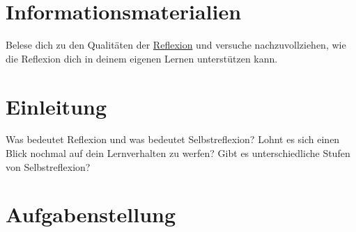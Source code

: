 \documentclass[a4paper,oneside]{scrarticle}
\begin{document}
	\pagebreak 
	
	\section*{Informationsmaterialien}
	
	Belese dich zu den Qualitäten der \href{https://doi.org/10.1007/s40692-020-00157-6}{Reflexion}\cite{sultana_e-portfolios_2020} und versuche nachzuvollziehen, wie die Reflexion dich in deinem eigenen Lernen unterstützen kann.
	
	
	
	
	
	\pagebreak
	
	\section*{Einleitung}
	Was bedeutet Reflexion und was bedeutet Selbstreflexion? Lohnt es sich einen Blick nochmal auf dein Lernverhalten zu werfen? Gibt es unterschiedliche Stufen von Selbstreflexion?
	
	\section*{Aufgabenstellung}
\end{document}
